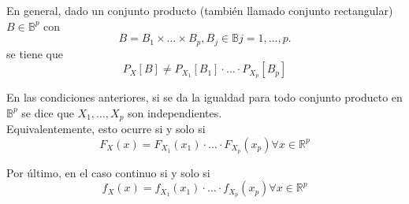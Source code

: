 En general, dado un conjunto producto (también llamado conjunto rectangular) $B \in \mathbb{B}^p$ con
\[
    B = B_1 \times \dots \times B_p, B_j \in \mathbb{B} j = 1, \dots, p
.\]
se tiene que
\[
P_X[B] \neq P_{X_1}[B_1]\cdot \dots \cdot P_{X_p}[B_p]
\]

\begin{ndef}
    En las condiciones anteriores, si se da la igualdad para todo conjunto producto en $\mathbb{B}^p$ se dice que $X_1, \dots, X_p$ son independientes. \\

    Equivalentemente, esto ocurre si y solo si
    \[
    F_X (x) = F_{X_1} (x_1)\cdot \dots \cdot F_{X_p}(x_p) \forall x \in \mathbb{R}^p
    \]

    Por último, en el caso continuo si y solo si
    \[
    f_X (x) = f_{X_1}(x_1) \cdot \dots \cdot f_{X_p}(x_p) \forall x \in \mathbb{R}^p
    \]
\end{ndef}
